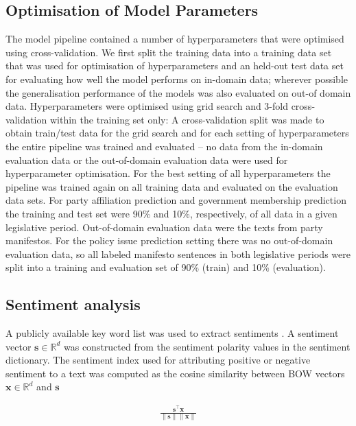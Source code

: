 \documentclass{article}
\renewcommand{\vec}[1]{\mathbf{#1}}
\newcommand{\R}{\mathds{R}}
\begin{document}
\subsection{Optimisation of Model Parameters}\label{sec:crossvalidation}
The model pipeline contained a number of  hyperparameters that were optimised using cross-validation.
We first split the training data into a training data set that was used for optimisation of hyperparameters and an held-out test data set for evaluating how well the model performs on in-domain data; wherever possible the generalisation performance of the models was also evaluated on out-of domain data. Hyperparameters were optimised using grid search and 3-fold cross-validation within the training set only: A cross-validation split was made to obtain train/test data for the grid search and for each setting of hyperparameters the entire pipeline was trained and evaluated -- no data from the in-domain evaluation data or the out-of-domain evaluation data were used for hyperparameter optimisation. For the best setting of all hyperparameters the pipeline was trained again on all training data and evaluated on the evaluation data sets. For party affiliation prediction and government membership prediction the training and test set were 90\% and 10\%, respectively, of all data in a given legislative period. Out-of-domain evaluation data were the texts from party manifestos. For the policy issue prediction setting there was no out-of-domain evaluation data, so all labeled manifesto sentences in both legislative periods were split into a training and evaluation set of 90\% (train) and 10\% (evaluation).

\subsection{Sentiment analysis}\label{sec:sentiment_analysis_methods}
A publicly available key word list was used to extract sentiments \cite{remquahey2010}. A sentiment vector $\vec{s}\in\R^d$ was constructed from the sentiment polarity values in the sentiment dictionary. The sentiment index used for attributing positive or negative sentiment to a text was computed as the cosine similarity between BOW vectors $\vec{x}\in\R^d$ and $\vec{s}$

\begin{align}
\frac{\vec{s}^\top \vec{x}}{\|\vec{s}\|\|\vec{x}\|}
\end{align}
\end{document}

